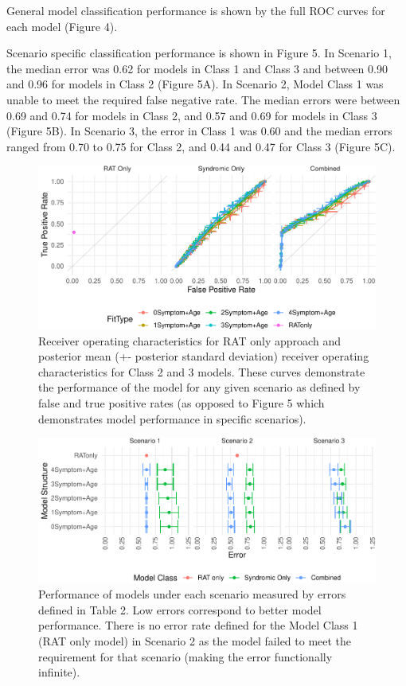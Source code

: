 \documentclass[]{elsarticle} %
\begin{document}
General model classification performance is shown by the full ROC curves
for each model (Figure 4).

Scenario specific classification performance is shown in Figure 5. In
Scenario 1, the median error was 0.62 for models in Class 1 and Class 3
and between 0.90 and 0.96 for models in Class 2 (Figure 5A). In Scenario
2, Model Class 1 was unable to meet the required false negative rate.
The median errors were between 0.69 and 0.74 for models in Class 2, and
0.57 and 0.69 for models in Class 3 (Figure 5B). In Scenario 3, the
error in Class 1 was 0.60 and the median errors ranged from 0.70 to 0.75
for Class 2, and 0.44 and 0.47 for Class 3 (Figure 5C).

\begin{figure}
\centering
\includegraphics{0501_MainText_files/figure-latex/ROC-plot-1.pdf}
\caption{Receiver operating characteristics for RAT only approach and
posterior mean (+- posterior standard deviation) receiver operating
characteristics for Class 2 and 3 models. These curves demonstrate the
performance of the model for any given scenario as defined by false and
true positive rates (as opposed to Figure 5 which demonstrates model
performance in specific scenarios).}
\end{figure}

\begin{figure}
\centering
\includegraphics{0501_MainText_files/figure-latex/scenario-plot-1.pdf}
\caption{Performance of models under each scenario measured by errors
defined in Table 2. Low errors correspond to better model performance.
There is no error rate defined for the Model Class 1 (RAT only model) in
Scenario 2 as the model failed to meet the requirement for that scenario
(making the error functionally infinite).}
\end{figure}
\end{document}
